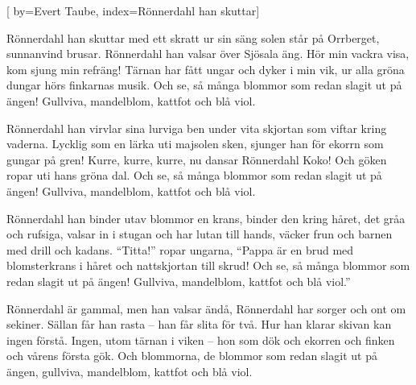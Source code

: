 


[ 	%
	by={Evert Taube},
	index={Rönnerdahl han skuttar}]		%
	
\beginverse*		%
Rönnerdahl han skuttar med ett skratt ur sin säng
solen står på Orrberget, sunnanvind brusar.
Rönnerdahl han valsar över Sjösala äng.
Hör min vackra visa, kom sjung min refräng!
Tärnan har fått ungar och dyker i min vik,
ur alla gröna dungar hörs finkarnas musik.
Och se, så många blommor
som redan slagit ut på ängen!
Gullviva, mandelblom, kattfot och blå viol.
\endverse			%

\beginverse*		%
Rönnerdahl han virvlar sina lurviga ben
under vita skjortan som viftar kring vaderna.
Lycklig som en lärka uti majsolen sken,
sjunger han för ekorrn som gungar på gren!
Kurre, kurre, kurre, nu dansar Rönnerdahl
Koko! Och göken ropar uti hans gröna dal.
Och se, så många blommor
som redan slagit ut på ängen!
Gullviva, mandelblom, kattfot och blå viol.
\endverse			%

\newpage
\beginverse*		%
Rönnerdahl han binder utav blommor en krans,
binder den kring håret, det gråa och rufsiga,
valsar in i stugan och har lutan till hands,
väcker frun och barnen med drill och kadans.
``Titta!'' ropar ungarna, ``Pappa är en brud 
med blomsterkrans i håret och nattskjortan till skrud!
Och se, så många blommor 
som redan slagit ut på ängen!
Gullviva, mandelblom, kattfot och blå viol.''
\endverse			%

\beginverse*		%
Rönnerdahl är gammal, men han valsar ändå,
Rönnerdahl har sorger och ont om sekiner.
Sällan får han rasta – han får slita för två.
Hur han klarar skivan kan ingen förstå.
Ingen, utom tärnan i viken – hon som dök
och ekorren och finken och vårens första gök.
Och blommorna, de blommor
som redan slagit ut på ängen,
gullviva, mandelblom, kattfot och blå viol.
\endverse			%
\endsong			%
